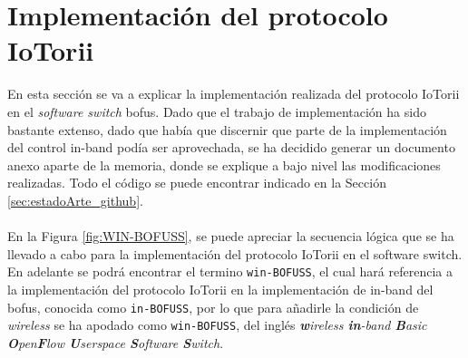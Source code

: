 \section{Implementación del protocolo IoTorii}
\label{sec:devIOTTORIII}

En esta sección se va a explicar la implementación realizada del protocolo IoTorii en el \textit{software switch} \gls{bofus}. Dado que el trabajo de implementación ha sido bastante extenso, dado que había que discernir que parte de la implementación del control in-band podía ser aprovechada, se ha decidido generar un documento anexo \cite{davidBOFUSS} aparte de la memoria, donde se explique a bajo nivel las modificaciones realizadas. Todo el código se puede encontrar indicado en la Sección \ref{sec:estadoArte_github}. \\
\\
En la Figura \ref{fig:WIN-BOFUSS}, se puede apreciar la secuencia lógica que se ha llevado a cabo para la implementación del protocolo IoTorii en el software switch. En adelante se podrá encontrar el termino \texttt{win-BOFUSS}, el cual hará referencia a la implementación del protocolo IoTorii en la implementación de in-band del \gls{bofus}, conocida como \texttt{in-BOFUSS}, por lo que para añadirle la condición de \textit{wireless} se ha apodado como \texttt{win-BOFUSS}, del inglés \textit{\textbf{w}ireless \textbf{in}-band \textbf{B}asic \textbf{O}pen\textbf{F}low \textbf{U}serspace \textbf{S}oftware \textbf{S}witch}.\\

